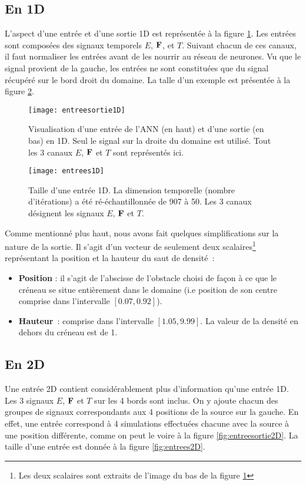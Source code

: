 \subsection{En 1D}
L'aspect d'une entrée et d'une sortie 1D est représentée à la figure \ref{fig:entreesortie1D}. Les entrées sont composées des signaux temporels $E$, $\mathbf{F}$, et $T$. Suivant chacun de ces canaux, il faut normaliser les entrées avant de les nourrir au réseau de neurones. Vu que le signal provient de la gauche, les entrées ne sont constituées que du signal récupéré sur le bord droit du domaine. La talle d'un exemple est présentée à la figure \ref{fig:entrees1D}. 

\begin{figure}[!h]
\centering
\texttt{[image: entreesortie1D]} 
\decoRule
\caption[entreesortie1D]{Visualisation d'une entrée de l'ANN (en haut) et d'une sortie (en bas) en 1D. Seul le signal sur la droite du domaine est utilisé. Tout les 3 canaux $E$, $\mathbf{F}$ et $T$ sont représentés ici.}
\label{fig:entreesortie1D}
\end{figure}

\begin{figure}[H]
\centering
\texttt{[image: entrees1D]} 
\decoRule
\caption[entrees1D]{Taille d'une entrée 1D. La dimension temporelle (nombre d'itérations) a été ré-échantillonnée de 907 à 50. Les 3 canaux désignent les signaux $E$, $\mathbf{F}$ et $T$.}
\label{fig:entrees1D}
\end{figure}

Comme mentionné plus haut, nous avons fait quelques simplifications sur la nature de la sortie. Il s'agit d'un vecteur de seulement deux scalaires\footnote{Les deux scalaires sont extraits de l'image du bas de la figure \ref{fig:entreesortie1D}} représentant la position et la hauteur du saut de densité :
\begin{itemize}
 \item \textbf{Position} : il s'agit de l'abscisse de l'obstacle choisi de façon à ce que le créneau se situe entièrement dans le domaine (i.e position de son centre comprise dans l'intervalle $[0.07,0.92]$).
 \item \textbf{Hauteur} : comprise dans l'intervalle $[1.05, 9.99]$. La valeur de la densité en dehors du créneau est de 1.
\end{itemize}


\subsection{En 2D}
Une entrée 2D contient considérablement plus d'information qu'une entrée 1D. Les 3 signaux $E$, $\mathbf{F}$ et $T$ sur les 4 bords sont inclus. On y ajoute chacun des groupes de signaux correspondants aux 4 positions de la source sur la gauche. En effet, une entrée correspond à 4 simulations effectuées chacune avec la source à une position différente, comme on peut le voire à la figure \ref{fig:entreesortie2D}. La taille d'une entrée est donnée à la figure \ref{fig:entrees2D}.

